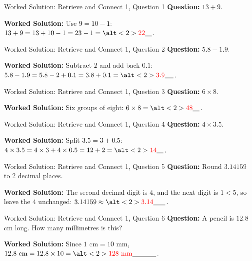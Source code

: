 \documentclass{beamer}
\newcommand{\ablank}[1]{%
  \alt<2>{\textcolor{red}{#1}}{\underline{\phantom{#1}}}%
}
\begin{document}
\begin{frame}{Worked Solution: Retrieve and Connect 1, Question 1}
\hypertarget{work-st1}{}
\small
\textbf{Question:} \(13+9\).

\textbf{Worked Solution:} Use \(9=10-1\):
\(13+9=13+10-1=23-1=\ablank{22}\).
\end{frame}

\begin{frame}{Worked Solution: Retrieve and Connect 1, Question 2}
\small
\textbf{Question:} \(5.8-1.9\).

\textbf{Worked Solution:} Subtract \(2\) and add back \(0.1\):
\(5.8-1.9=5.8-2+0.1=3.8+0.1=\ablank{3.9}\).
\end{frame}

\begin{frame}{Worked Solution: Retrieve and Connect 1, Question 3}
\small
\textbf{Question:} \(6\times8\).

\textbf{Worked Solution:} Six groups of eight:
\(6\times8=\ablank{48}\).
\end{frame}

\begin{frame}{Worked Solution: Retrieve and Connect 1, Question 4}
\small
\textbf{Question:} \(4\times3.5\).

\textbf{Worked Solution:} Split \(3.5=3+0.5\):
\(4\times3.5=4\times3+4\times0.5=12+2=\ablank{14}\).
\end{frame}

\begin{frame}{Worked Solution: Retrieve and Connect 1, Question 5}
\small
\textbf{Question:} Round \(3.14159\) to 2 decimal places.

\textbf{Worked Solution:} The second decimal digit is \(4\), and the next digit is \(1<5\), so leave the \(4\) unchanged:
\(3.14159\approx\ablank{3.14}\).
\end{frame}

\begin{frame}{Worked Solution: Retrieve and Connect 1, Question 6}
\small
\textbf{Question:} A pencil is \(12.8\) cm long. How many millimetres is this?

\textbf{Worked Solution:} Since \(1\text{ cm}=10\text{ mm}\),
\(12.8\text{ cm}=12.8\times10=\ablank{128\text{ mm}}\).
\end{frame}
\end{document}
